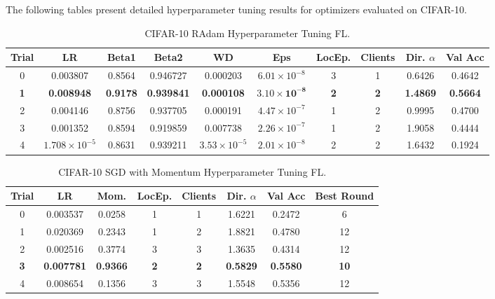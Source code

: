\documentclass[10pt,twocolumn,letterpaper]{article}
\begin{document}
    The following tables present detailed hyperparameter tuning results for optimizers evaluated on CIFAR-10.

    \begin{table}[h]
        \centering
        \caption{CIFAR-10 RAdam Hyperparameter Tuning FL.}
        \label{tab:radam_cifar10_hpt}
        \begin{tabular}{cccccccccc}
            \toprule
            \textbf{Trial} & \textbf{LR} & \textbf{Beta1} & \textbf{Beta2} & \textbf{WD} & \textbf{Eps} & \textbf{LocEp.} & \textbf{Clients} & \textbf{Dir. $\alpha$} & \textbf{Val Acc} \\
            \midrule
            0 & 0.003807 & 0.8564 & 0.946727 & 0.000203 & $6.01 \times 10^{-8}$ & 3 & 1 & 0.6426 & 0.4642 \\
            \textbf{1} & \textbf{0.008948} & \textbf{0.9178} & \textbf{0.939841} & \textbf{0.000108} & $\mathbf{3.10 \times 10^{-8}}$ & \textbf{2} & \textbf{2} & \textbf{1.4869} & \textbf{0.5664} \\
            2 & 0.004146 & 0.8756 & 0.937705 & 0.000191 & $4.47 \times 10^{-7}$ & 1 & 2 & 0.9995 & 0.4700 \\
            3 & 0.001352 & 0.8594 & 0.919859 & 0.007738 & $2.26 \times 10^{-7}$ & 1 & 2 & 1.9058 & 0.4444 \\
            4 & $1.708 \times 10^{-5}$ & 0.8631 & 0.939211 & $3.53 \times 10^{-5}$ & $2.01 \times 10^{-8}$ & 2 & 2 & 1.6432 & 0.1924 \\
            \bottomrule
        \end{tabular}
    \end{table}

    \begin{table}[h]
        \centering
        \caption{CIFAR-10 SGD with Momentum Hyperparameter Tuning FL.}
        \label{tab:sgd_momentum_cifar10_hpt}
        \begin{tabular}{cccccccc}
            \toprule
            \textbf{Trial} & \textbf{LR} & \textbf{Mom.} & \textbf{LocEp.} & \textbf{Clients} & \textbf{Dir. $\alpha$} & \textbf{Val Acc} & \textbf{Best Round} \\
            \midrule
            0 & 0.003537 & 0.0258 & 1 & 1 & 1.6221 & 0.2472 & 6 \\
            1 & 0.020369 & 0.2343 & 1 & 2 & 1.8821 & 0.4780 & 12 \\
            2 & 0.002516 & 0.3774 & 3 & 3 & 1.3635 & 0.4314 & 12 \\
            \textbf{3} & \textbf{0.007781} & \textbf{0.9366} & \textbf{2} & \textbf{2} & \textbf{0.5829} & \textbf{0.5580} & \textbf{10} \\
            4 & 0.008654 & 0.1356 & 3 & 3 & 1.5548 & 0.5356 & 12 \\
            \bottomrule
        \end{tabular}
    \end{table}
\end{document}
